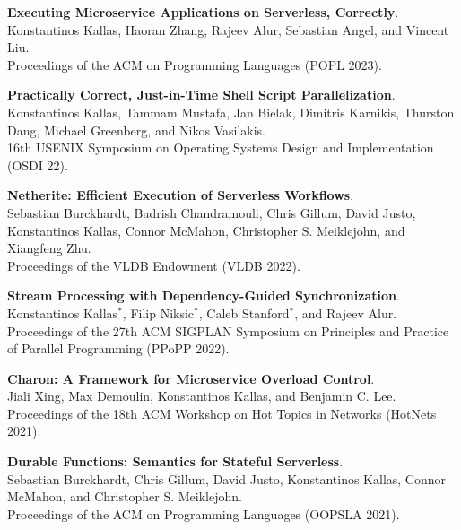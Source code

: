 \begin{minipage}{\textwidth}
\textbf{Executing Microservice Applications on Serverless, Correctly}. \\
Konstantinos Kallas, Haoran Zhang, Rajeev Alur, Sebastian Angel, and Vincent Liu. \\
Proceedings of the ACM on Programming Languages (POPL 2023).
\end{minipage}

\begin{minipage}{\textwidth}
\textbf{Practically Correct, Just-in-Time Shell Script Parallelization}. \\
Konstantinos Kallas, Tammam Mustafa, Jan Bielak, Dimitris Karnikis, Thurston Dang, Michael Greenberg, and Nikos Vasilakis. \\
16th USENIX Symposium on Operating Systems Design and Implementation (OSDI 22).
\end{minipage}

\begin{minipage}{\textwidth}
\textbf{Netherite: Efficient Execution of Serverless Workflows}. \\
Sebastian Burckhardt, Badrish Chandramouli, Chris Gillum, David Justo, Konstantinos Kallas, Connor McMahon, Christopher S. Meiklejohn, and Xiangfeng Zhu. \\
Proceedings of the VLDB Endowment (VLDB 2022).
\end{minipage}

\begin{minipage}{\textwidth}
\textbf{Stream Processing with Dependency-Guided Synchronization}. \\
Konstantinos Kallas$^*$, Filip Niksic$^*$, Caleb Stanford$^*$, and Rajeev Alur. \\
Proceedings of the 27th ACM SIGPLAN Symposium on Principles and Practice of Parallel Programming (PPoPP 2022).
\end{minipage}

\begin{minipage}{\textwidth}
\textbf{Charon: A Framework for Microservice Overload Control}. \\
Jiali Xing, Max Demoulin, Konstantinos Kallas, and Benjamin C. Lee. \\
Proceedings of the 18th ACM Workshop on Hot Topics in Networks (HotNets 2021).
\end{minipage}

\begin{minipage}{\textwidth}
\textbf{Durable Functions: Semantics for Stateful Serverless}. \\
Sebastian Burckhardt, Chris Gillum, David Justo, Konstantinos Kallas, Connor McMahon, and Christopher S. Meiklejohn. \\
Proceedings of the ACM on Programming Languages (OOPSLA 2021).
\end{minipage}

